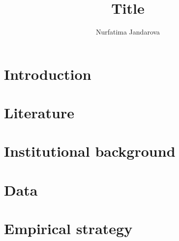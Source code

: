 \documentclass[a4paper, 11pt]{article}
\title{Title}
\author{Nurfatima Jandarova}
\begin{document}
\maketitle

\begin{abstract}
	
\end{abstract}







\hypertarget{introduction}{%
\section*{Introduction}\label{introduction}}

\hypertarget{literature}{%
\section*{Literature}\label{literature}}

\hypertarget{institutional-background}{%
\section*{Institutional background}\label{institutional-background}}

\hypertarget{data}{%
\section*{Data}\label{data}}

\hypertarget{empirical-strategy}{%
\section*{Empirical strategy}\label{empirical-strategy}}
\end{document}
